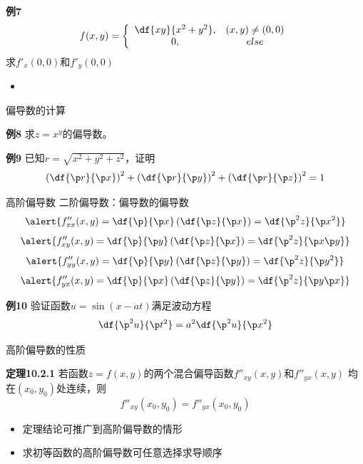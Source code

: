 \begin{frame}
	\linespread{1.2}
	\begin{exampleblock}{{\bf 例7}\hfill}
		$$f(x,y)=\left\{\begin{array}{cc}
			\df{xy}{x^2+y^2}, & (x,y)\ne (0,0)\\
			0, & else
		\end{array}\right.$$
		求$f'_x(0,0)$和$f'_y(0,0)$
	\end{exampleblock}\pause 
	\begin{itemize}
	  \item {}
	\end{itemize}
\end{frame}

\begin{frame}{偏导数的计算}
	\linespread{1.2}\pause 
	\pause 
	\begin{exampleblock}{{\bf 例8}\hfill}
		求$z=x^y$的偏导数。
	\end{exampleblock}\pause 
	\begin{exampleblock}{{\bf 例9}\hfill}
		已知$r=\sqrt{x^2+y^2+z^2}$，证明
		$$\left(\df{\p r}{\p x}\right)^2+\left(\df{\p r}{\p y}\right)^2+\left(\df{\p
		r}{\p z}\right)^2=1$$
	\end{exampleblock}
\end{frame}

\begin{frame}{高阶偏导数}
	\linespread{1.2}\pause 
	{\bb 二阶偏导数：}偏导数的偏导数\pause 
	$$\alert{f''_{xx}(x,y)=\df{\p}{\p x}\left(\df{\p z}{\p x}\right)
	=\df{\p^2 z}{\p x^2}}$$\pause 
	$$\alert{f''_{xy}(x,y)=\df{\p}{\p y}\left(\df{\p z}{\p x}\right)
	=\df{\p^2 z}{\p x\p y}}$$\pause 
	$$\alert{f''_{yy}(x,y)=\df{\p}{\p y}\left(\df{\p z}{\p y}\right)
	=\df{\p^2 z}{\p y^2}}$$\pause 
	$$\alert{f''_{yx}(x,y)=\df{\p}{\p x}\left(\df{\p z}{\p y}\right)
	=\df{\p^2 z}{\p y\p x}}$$
\end{frame}

\begin{frame}
	\linespread{1.2}
	\begin{exampleblock}{{\bf 例10}\hfill}
		验证函数$u=\sin(x-at)$满足{\bb 波动方程}
		$$\df{\p^2u}{\p t^2}=a^2\df{\p^2u}{\p x^2}$$
	\end{exampleblock}
\end{frame}

\begin{frame}{高阶偏导数的性质}
	\linespread{1.2}\pause 
	\begin{block}{{\bf 定理10.2.1}\hfill}
		若函数$z=f(x,y)$的两个混合偏导函数$f''_{xy}(x,y)$和$f''_{yx}(x,y)$
		均在$(x_0,y_0)$处连续，则
		$$f''_{xy}(x_0,y_0)=f''_{yx}(x_0,y_0)$$
	\end{block}\pause 
	\begin{itemize}
	  \item 定理结论可推广到高阶偏导数的情形\pause 
	  \item \alert{求初等函数的高阶偏导数可任意选择求导顺序}
	\end{itemize}
\end{frame}


